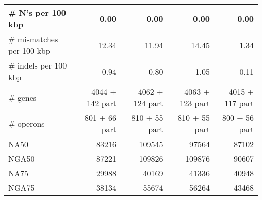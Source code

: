 \begin{table}[ht]
\begin{center}
\begin{tabular}{|l*{4}{|r}|}
\# N's per 100 kbp & 0.00 & 0.00 & 0.00 & 0.00 \\ \hline
\# mismatches per 100 kbp & 12.34 & 11.94 & 14.45 & 1.34 \\ \hline
\# indels per 100 kbp & 0.94 & 0.80 & 1.05 & 0.11 \\ \hline
\# genes & 4044 + 142 part & 4062 + 124 part & 4063 + 123 part & 4015 + 117 part \\ \hline
\# operons & 801 + 66 part & 810 + 55 part & 810 + 55 part & 800 + 56 part \\ \hline
NA50 & 83216 & 109545 & 97564 & 87102 \\ \hline
NGA50 & 87221 & 109826 & 109876 & 90607 \\ \hline
NA75 & 29988 & 40169 & 41336 & 40948 \\ \hline
NGA75 & 38134 & 55674 & 56264 & 43468 \\ \hline
\end{tabular}
\end{center}
\end{table}
